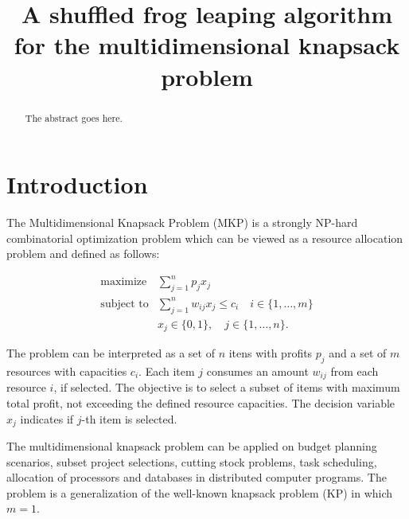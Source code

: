 \documentclass[10pt, conference, compsocconf]{IEEEtran}
\begin{document}
\title{A shuffled frog leaping algorithm for
the multidimensional knapsack problem}

\author{
\and
{}
}

\maketitle

\begin{abstract}
The abstract goes here.
\end{abstract}

\section{Introduction}
\label{sec:intro}

The Multidimensional Knapsack Problem (MKP) is a strongly NP-hard combinatorial
optimization problem which can be viewed as a resource allocation problem and
defined as follows:

\begin{align*}
  \text{maximize} & \sum_{j=1}^n p_j x_j \\
  \text{subject to} & \sum_{j=1}^n w_{ij} x_j \leqslant c_i \quad i \in \{1, \ldots, m\}\\
   & x_j \in \{0, 1\}, \quad j \in \{1, \ldots, n\}.
\end{align*}

The problem can be interpreted as a set of $n$ itens with profits $p_j$
and a set of $m$ resources with capacities $c_i$.
Each item $j$ consumes an amount $w_{ij}$ from each resource $i$, if selected.
The objective is to select a subset of items with maximum total profit,
not exceeding the defined resource capacities.
The decision variable $x_j$ indicates if $j$-th item is selected.

The multidimensional knapsack problem can be applied on budget planning 
scenarios, subset project selections, cutting stock problems, task scheduling,
allocation of processors and databases in distributed computer programs.
The problem is a generalization of the well-known knapsack problem (KP) in which
$m = 1$.
\end{document}
